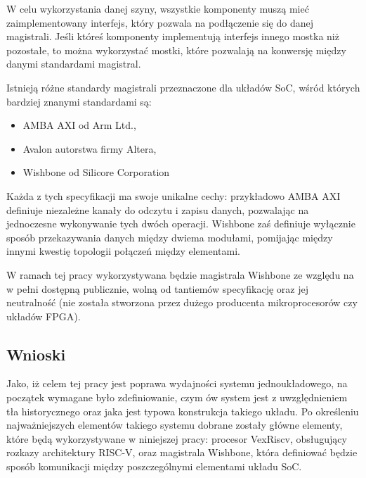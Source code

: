 W celu wykorzystania danej szyny, wszystkie komponenty muszą mieć zaimplementowany interfejs, który pozwala na podłączenie się do danej magistrali. Jeśli któreś komponenty implementują interfejs innego mostka niż pozostałe, to można wykorzystać mostki, które pozwalają na konwersję między danymi standardami magistral.

Istnieją różne standardy magistrali przeznaczone dla układów SoC, wśród których bardziej znanymi standardami są:
\begin{itemize}
	\item AMBA AXI\cite{amba-axi:2021:Online} od Arm Ltd.,
	\item Avalon\cite{avalon:2005:Online} autorstwa firmy Altera,
	\item Wishbone\cite{wishbone:2019:Online} od Silicore Corporation
\end{itemize}

Każda z tych specyfikacji ma swoje unikalne cechy: przykładowo AMBA AXI definiuje niezależne kanały do odczytu i zapisu danych, pozwalając na jednoczesne wykonywanie tych dwóch operacji. Wishbone zaś definiuje wyłącznie sposób przekazywania danych między dwiema modułami, pomijając między innymi kwestię topologii połączeń między elementami.

W ramach tej pracy wykorzystywana będzie magistrala Wishbone ze względu na w pełni dostępną publicznie, wolną od tantiemów specyfikację oraz jej neutralność (nie została stworzona przez dużego producenta mikroprocesorów czy układów FPGA).

\subsection{Wnioski}

Jako, iż celem tej pracy jest poprawa wydajności systemu jednoukładowego, na początek wymagane było zdefiniowanie, czym ów system jest z uwzględnieniem tła historycznego oraz jaka jest typowa konstrukcja takiego układu. Po określeniu najważniejszych elementów takiego systemu dobrane zostały główne elementy, które będą wykorzystywane w niniejszej pracy: procesor VexRiscv, obsługujący rozkazy architektury RISC-V, oraz magistrala Wishbone, która definiować będzie sposób komunikacji między poszczególnymi elementami układu SoC.
